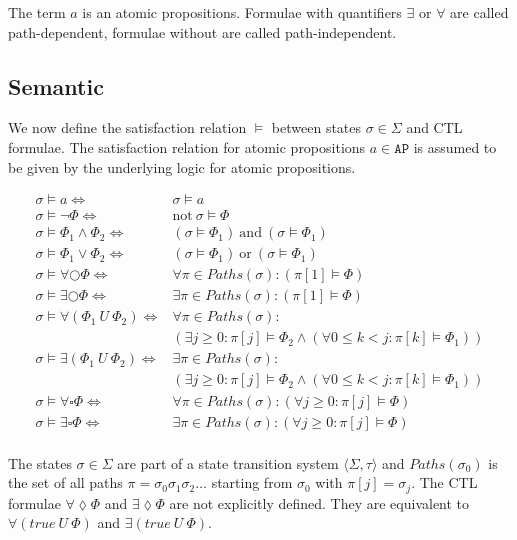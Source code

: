 \documentclass[11pt,a4paper,titlepage]{article}
\theoremstyle{definition}
\begin{document}
The term $a$ is an atomic propositions. Formulae with quantifiers $\exists$ or $\forall$ are called
path-dependent, formulae without are called path-independent.

\subsection{Semantic}

We now define the satisfaction relation $\models$ between states $\sigma \in \Sigma$ and CTL formulae.
The satisfaction relation for atomic propositions $a \in \mathtt{AP}$ is assumed to be given by the underlying 
logic for atomic propositions.

\begin{align*}
    \sigma \models a  \iff &\sigma \models a \\ 
    \sigma \models \neg \Phi  \iff &\text{not} \ \sigma \models \Phi \\ 
    \sigma \models \Phi_1 \land \Phi_2   \iff &(\sigma \models \Phi_1) \ \text{and} \ (\sigma \models \Phi_1) \\ 
    \sigma \models \Phi_1 \lor \Phi_2   \iff &(\sigma \models \Phi_1) \ \text{or} \ (\sigma \models \Phi_1) \\ 
    \sigma \models \forall\bigcirc\Phi \iff  &\forall \pi \in Paths(\sigma) \colon (\pi [1] \models \Phi) \\ 
    \sigma \models \exists\bigcirc\Phi \iff  &\exists \pi \in Paths(\sigma) \colon (\pi [1] \models \Phi) \\ 
    \sigma \models \forall(\Phi_1 \ U \ \Phi_2) \iff &\forall \pi \in Paths(\sigma) \colon \\
    &(\exists j \geq 0 \colon \pi[j] \models \Phi_2 \land (\forall 0 \leq k < j \colon \pi[k] \models \Phi_1)) \\ 
    \sigma \models \exists(\Phi_1 \ U \ \Phi_2) \iff &\exists \pi \in Paths(\sigma) \colon\\
    &(\exists j \geq 0 \colon \pi[j] \models \Phi_2 \land (\forall 0 \leq k < j \colon \pi[k] \models \Phi_1)) \\ 
    \sigma \models \forall\square\Phi \iff  &\forall \pi \in Paths(\sigma) \colon (\forall j \geq 0 \colon \pi[j] \models \Phi) \\ 
    \sigma \models \exists\square\Phi \iff  &\exists \pi \in Paths(\sigma) \colon (\forall j \geq 0 \colon \pi[j] \models \Phi) \\ 
\end{align*}

The states $\sigma \in \Sigma$ are part of a state transition system $\langle \Sigma, \tau \rangle$ and 
$Paths(\sigma_0)$ is the set of all paths $\pi = \sigma_0 \sigma_1 \sigma_2 \dots$ starting from $\sigma_0$ with $\pi[j] = \sigma_j$.
The CTL formulae $\forall\lozenge\Phi$ and $\exists\lozenge\Phi$ are not explicitly defined. They are equivalent to 
$\forall(true \ U \ \Phi)$ and $\exists(true \ U \ \Phi)$. \\
\end{document}
